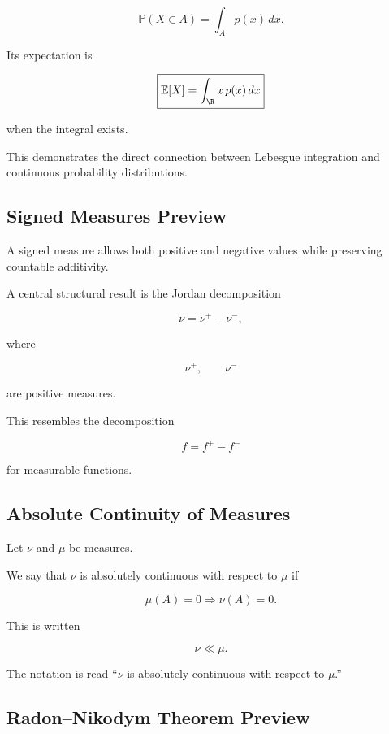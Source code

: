 \[
\boxed{
\mathbb{P}(X\in A)
=
\int_Ap(x)\,dx.
}
\]

Its expectation is

\[
\boxed{
\mathbb{E}[X]
=
\int_{\R}x\,p(x)\,dx
}
\]

when the integral exists.

This demonstrates the direct connection between Lebesgue integration and
continuous probability distributions.

\subsection{Signed Measures Preview}
\label{subsec:signed-measures-preview}

A signed measure allows both positive and negative values while preserving
countable additivity.

A central structural result is the Jordan decomposition

\[
\boxed{
\nu=\nu^+-\nu^-,
}
\]

where

\[
\nu^+,
\qquad
\nu^-
\]

are positive measures.

This resembles the decomposition

\[
f=f^+-f^-
\]

for measurable functions.

\subsection{Absolute Continuity of Measures}
\label{subsec:absolute-continuity-measures}

Let \(\nu\) and \(\mu\) be measures.

We say that \(\nu\) is absolutely continuous with respect to \(\mu\) if

\[
\boxed{
\mu(A)=0
\Longrightarrow
\nu(A)=0.
}
\]

This is written

\[
\boxed{
\nu\ll\mu.
}
\]

The notation is read ``\(\nu\) is absolutely continuous with respect to
\(\mu\).''

\subsection{Radon--Nikodym Theorem Preview}
\label{subsec:radon-nikodym-preview}

